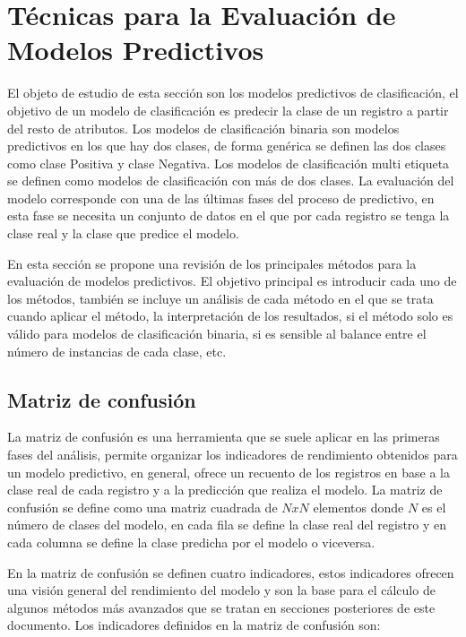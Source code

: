 \section{Técnicas para la Evaluación de Modelos Predictivos}


El objeto de estudio de esta sección son los modelos predictivos de clasificación, el objetivo de un modelo de clasificación es predecir la clase de un registro a partir del resto de atributos. Los modelos de clasificación binaria son modelos predictivos en los que hay dos clases, de forma genérica se definen las dos clases como clase Positiva y clase Negativa. Los modelos de clasificación multi etiqueta se definen como modelos de clasificación con más de dos clases. La evaluación del modelo corresponde con una de las últimas fases del proceso de predictivo, en esta fase se necesita un conjunto de datos en el que por cada registro se tenga la clase real y la clase que predice el modelo.

\bigbreak

En esta sección se propone una revisión de los principales métodos para la evaluación de modelos predictivos. El objetivo principal es introducir cada uno de los métodos, también se incluye un análisis de cada método en el que se trata cuando aplicar el método, la interpretación de los resultados, si el método solo es válido para modelos de clasificación binaria, si es sensible al balance entre el número de instancias de cada clase, etc.

\subsection{Matriz de confusión}

La matriz de confusión es una herramienta que se suele aplicar en las primeras fases del análisis, permite organizar los indicadores de rendimiento obtenidos para un modelo predictivo, en general, ofrece un recuento de los registros en base a la clase real de cada registro y a la predicción que realiza el modelo. La matriz de confusión se define como una matriz cuadrada de $NxN$ elementos donde $N$ es el número de clases del modelo, en cada fila se define la clase real del registro y en cada columna se define la clase predicha por el modelo o viceversa.

\bigbreak

En la matriz de confusión se definen cuatro indicadores, estos indicadores ofrecen una visión general del rendimiento del modelo y son la base para el cálculo de algunos métodos más avanzados que se tratan en secciones posteriores de este documento. Los indicadores definidos en la matriz de confusión son:

